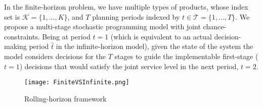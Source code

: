 \documentclass[11pt]{article}
\newcommand{\ti}{t} %
\newcommand{\TI}{\mathcal{T}}
\newcommand{\Ti}{T}
\newcommand{\KA}{\mathcal{K}}
\newcommand{\Ka}{K}
\newcommand{\tAct}{\hat{\ti}} %
\begin{document}
In the finite-horizon problem, we have multiple types of products, whose index set is $\KA= \{1,...,\Ka\}$, and $\Ti$ planning periods indexed by $\ti \in \TI=\{1 , ..., \Ti\}$. We propose a multi-stage stochastic programming model with joint chance-constraints.
Being at period $t=1$  (which is equivalent to an actual decision-making period $\tAct$ in the infinite-horizon model), given the state of the system the model considers decisions for the $\Ti$ stages to guide the implementable first-stage ($\ti =1$) decisions that would satisfy the joint service level in the next period, $\ti=2$.



\begin{figure}[!h]
\begin{center}
\texttt{[image: FiniteVSInfinite.png]}
\caption{Rolling-horizon framework} 
\label{fig:FiniteVSInfinite}
\end{center}
\end{figure}



\end{document}
